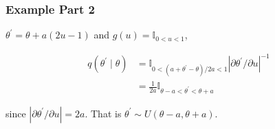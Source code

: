 \documentclass[10pt]{article}
\begin{document}
\subsubsection*{Example Part 2}
$\theta^{\prime}=\theta+a(2 u-1)$ and $g(u)=\mathbb{I}_{0<u<1}$,

$$
\begin{aligned}
q\left(\theta^{\prime} \mid \theta\right) & =\mathbb{I}_{0<\left(a+\theta^{\prime}-\theta\right) / 2 a<1}\left|\partial \theta^{\prime} / \partial u\right|^{-1} \\
& =\frac{1}{2 a} \mathbb{I}_{\theta-a<\theta^{\prime}<\theta+a}
\end{aligned}
$$

since $\left|\partial \theta^{\prime} / \partial u\right|=2 a$. That is $\theta^{\prime} \sim U(\theta-a, \theta+a)$.
\end{document}
